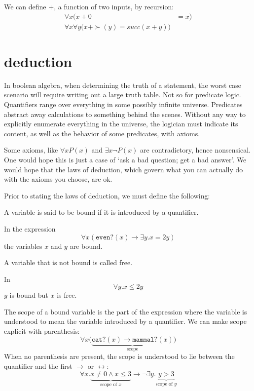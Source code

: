 \documentclass{scrbook}
\renewcommand{\implies}{\to}
\renewcommand{\iff}{\leftrightarrow}
\begin{document}
\begin{defn}[plus]
  \label{defn:peano:+}
  We can define $+$, a function of two inputs, by recursion:
  \begin{align*}
    \forall x (x + 0 &= x) \\
    \forall x \forall y \bigl(x + \succ(y) = succ(x+y)\bigr)
  \end{align*}
\end{defn}
\section[Deduction]{deduction}
In boolean algebra, when determining the truth of a statement, the worst case scenario will require writing out a large truth table. Not so for predicate logic. Quantifiers range over everything in some possibly infinite universe. Predicates abstract away calculations to something behind the scenes. Without any way to explicitly enumerate everything in the universe, the logician must indicate its content, as well as the behavior of some predicates, with axioms.  

Some axioms, like $\forall x P(x)$ and $\exists x \neg P(x)$ are contradictory, hence nonsensical. One would hope this is just a case of `ask a bad question; get a bad answer'. We would hope that the laws of deduction, which govern what you can actually do with the axioms you choose, are ok. 

Prior to stating the laws of deduction, we must define the following: 
\begin{defn}
  A variable is said to be bound if it is introduced by a quantifier. 
\end{defn}
\begin{example}
  In the expression
  \[
  \forall x (\texttt{even?}(x)\implies \exists y . x=2y)
  \]
  the variables $x$ and $y$ are bound.  
\end{example}
\begin{defn}
  A variable that is not bound is called free. 
\end{defn}
\begin{example}
  In 
  \[
  \forall y . x\leq 2y
  \]
  $y$ is bound but $x$ is free. 
\end{example}
\begin{defn}[scope]
  The scope of a bound variable is the part of the expression where the variable is understood to mean the variable introduced by a quantifier. We can make scope explicit with parenthesis:
  \[
  \forall x \bigl(\underbrace{\texttt{cat?}(x)\implies \texttt{mammal?}(x)}_{\textrm{scope}}\bigr)
  \]
  When no parenthesis are present, the scope is understood to lie between the quantifier and the first $\implies$ or $\iff$:
  \[
  \forall x . \underbrace{x\neq 0\wedge x \leq 3}_{\textrm{scope of $x$}}  \implies \neg \exists y . \underbrace{y > 3}_{\textrm{scope of $y$}}
  \]
\end{defn}
\end{document}

